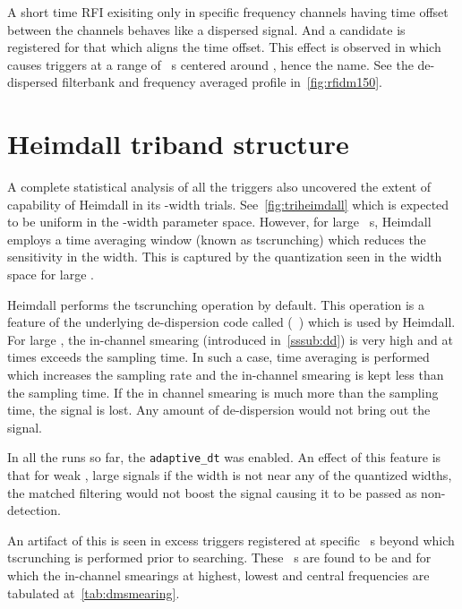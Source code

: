 \par A short time RFI exisiting only in specific frequency channels having time offset between the channels behaves like a dispersed signal. 
And a candidate is registered for that \dm which aligns the time offset.
This effect is observed in \vfpfs which causes triggers at a range of \dm~s centered around , hence the name. See the de-dispersed filterbank and frequency averaged profile in~\autoref{fig:rfidm150}.

\begin{figure}
	\label{fig:rfidm150}
	\caption{}
\end{figure}

\section {Heimdall triband structure}
\label{sec:htriband}
\par A complete statistical analysis of all the triggers also uncovered the extent of capability of Heimdall in its \dm-width trials.
See~\autoref{fig:triheimdall} which is expected to be uniform in the \dm-width parameter space. 
However, for large \dm~s, Heimdall employs a time averaging window (known as tscrunching) which reduces the sensitivity in the width. 
This is captured by the quantization seen in the width space for large \dm.

\par Heimdall performs the tscrunching operation by default. 
This operation is a feature of the underlying de-dispersion code called (~\cite{dedisp}) which is used by Heimdall. 
For large \dm, the in-channel smearing (introduced in~\autoref{sssub:dd}) is very high and at times exceeds the sampling time. In such a case, time averaging is performed which increases the sampling rate and the in-channel smearing is kept less than the sampling time.
If the in channel smearing is much more than the sampling time, the signal is lost. Any amount of de-dispersion would not bring out the signal.

\par In all the runs so far, the \texttt{adaptive\_dt} was enabled. 
An effect of this feature is that for weak \sn, large \dm signals if the width is not near any of the quantized widths, the matched filtering would not boost the signal causing it to be passed as non-detection.

\par An artifact of this is seen in excess triggers registered at specific \dm~s beyond which tscrunching is performed prior to searching.
These \dm~s are found to be  and  for which the in-channel smearings at highest, lowest and central frequencies are tabulated at~\autoref{tab:dmsmearing}.

